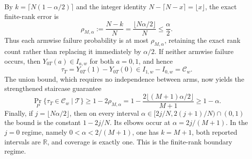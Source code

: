 By \(k=\lceil N(1-\alpha/2)\rceil\) and the integer identity \(N-\lceil N-x\rceil=\lfloor x\rfloor\), the exact finite-rank error is
\[
\rho_{M,\alpha}:=\frac{N-k}{N}=\frac{\lfloor N\alpha/2\rfloor}{N}\le\frac{\alpha}{2}.
\]
Thus each armwise failure probability is at most \(\rho_{M,\alpha}\), retaining the exact rank count rather than replacing it immediately by \(\alpha/2\). If neither armwise failure occurs, then \(Y_{0T}(a)\in I_{a,w}\) for both \(a=0,1\), and hence
\[
\tau_T=Y_{0T}(1)-Y_{0T}(0)\in I_{1,w}-I_{0,w}=\mathcal C_w.
\]
The union bound, which requires no independence between arms, now yields the strengthened staircase guarantee
\[
\Pr_P\{\tau_T\in\mathcal C_w\mid\mathcal T\}
\ge 1-2\rho_{M,\alpha}
=1-\frac{2\lfloor(M+1)\alpha/2\rfloor}{M+1}
\ge1-\alpha.
\]
Finally, if \(j=\lfloor N\alpha/2\rfloor\), then on every interval \(\alpha\in[2j/N,2(j+1)/N)\cap(0,1)\) the bound is the constant \(1-2j/N\). Its elbows occur at \(\alpha=2j/(M+1)\). In the \(j=0\) regime, namely \(0<\alpha<2/(M+1)\), one has \(k=M+1\), both reported intervals are \(\mathbb R\), and coverage is exactly one. This is the finite-rank boundary regime.